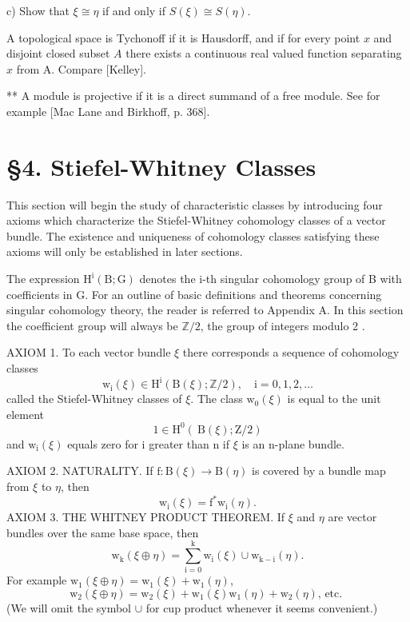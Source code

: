 \documentclass[10pt]{article}
\begin{document}
c) Show that $\xi \cong \eta$ if and only if $S(\xi) \cong S(\eta)$.

A topological space is Tychonoff if it is Hausdorff, and if for every point $x$ and disjoint closed subset $A$ there exists a continuous real valued function separating $x$ from A. Compare [Kelley].

** A module is projective if it is a direct summand of a free module. See for example [Mac Lane and Birkhoff, p. 368].

\section{§4. Stiefel-Whitney Classes}
This section will begin the study of characteristic classes by introducing four axioms which characterize the Stiefel-Whitney cohomology classes of a vector bundle. The existence and uniqueness of cohomology classes satisfying these axioms will only be established in later sections.

The expression $\mathrm{H}^{\mathrm{i}}(\mathrm{B} ; \mathrm{G})$ denotes the i-th singular cohomology group of B with coefficients in G. For an outline of basic definitions and theorems concerning singular cohomology theory, the reader is referred to Appendix A. In this section the coefficient group will always be $\mathbb{Z} / 2$, the group of integers modulo 2 .

AXIOM 1. To each vector bundle $\xi$ there corresponds a sequence of cohomology classes
$$
\mathrm{w}_{\mathrm{i}}(\xi) \in \mathrm{H}^{\mathrm{i}}(\mathrm{B}(\xi) ; \mathbb{Z} / 2), \quad \mathrm{i}=0,1,2, \ldots
$$
called the Stiefel-Whitney classes of $\xi$. The class $\mathrm{w}_{0}(\xi)$ is equal to the unit element
$$
1 \in \mathrm{H}^{0}(\mathrm{~B}(\xi) ; \mathrm{Z} / 2)
$$
and $\mathrm{w}_{\mathrm{i}}(\xi)$ equals zero for $\mathrm{i}$ greater than $\mathrm{n}$ if $\xi$ is an $\mathrm{n}$-plane bundle.

AXIOM 2. NATURALITY. If $\mathrm{f}: \mathrm{B}(\xi) \rightarrow \mathrm{B}(\eta)$ is covered by a bundle map from $\xi$ to $\eta$, then
$$
\mathrm{w}_{\mathrm{i}}(\xi)=\mathrm{f}^{*} \mathrm{w}_{\mathrm{i}}(\eta) .
$$
AXIOM 3. THE WHITNEY PRODUCT THEOREM. If $\xi$ and $\eta$ are vector bundles over the same base space, then
$$
\mathrm{w}_{\mathrm{k}}(\xi \oplus \eta)=\sum_{\mathrm{i}=0}^{\mathrm{k}} \mathrm{w}_{\mathrm{i}}(\xi) \cup \mathrm{w}_{\mathrm{k}-\mathrm{i}}(\eta) .
$$
For example $\mathrm{w}_{1}(\xi \oplus \eta)=\mathrm{w}_{1}(\xi)+\mathrm{w}_{1}(\eta)$,
$$
\mathrm{w}_{2}(\xi \oplus \eta)=\mathrm{w}_{2}(\xi)+\mathrm{w}_{1}(\xi) \mathrm{w}_{1}(\eta)+\mathrm{w}_{2}(\eta) \text {, etc. }
$$
(We will omit the symbol $\cup$ for cup product whenever it seems convenient.)
\end{document}
